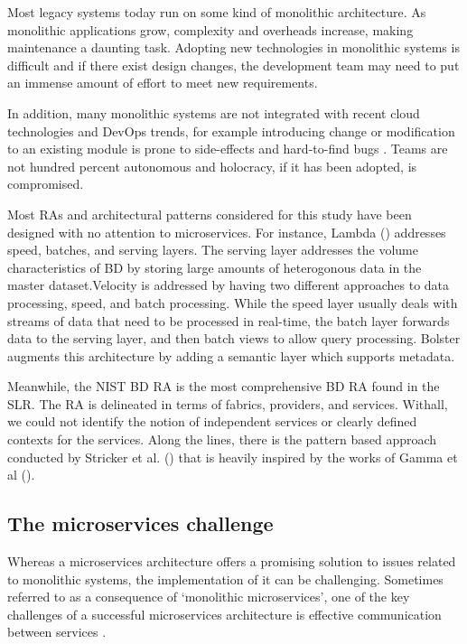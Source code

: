 \documentclass[runningheads]{llncs}
\begin{document}
Most legacy systems today run on some kind of monolithic architecture. As monolithic applications grow, complexity and overheads increase, making maintenance a daunting task. Adopting new technologies in monolithic systems is difficult and if there exist design changes, the development team may need to put an immense amount of effort to meet new requirements.

In addition, many monolithic systems are not integrated with recent cloud technologies and DevOps trends, for example introducing change or modification to an existing module is prone to side-effects and hard-to-find bugs \cite{Bass,Fritzsch}. Teams are not hundred percent autonomous and holocracy, if it has been adopted, is compromised.

Most RAs and architectural patterns considered for this study have been designed with no attention to microservices. For instance, Lambda (\cite{Villari}) addresses speed, batches, and serving layers. The serving layer addresses the volume characteristics of BD by storing large amounts of heterogonous data in the master dataset.Velocity is addressed by having two different approaches to data processing, speed, and batch processing. While the speed layer usually deals with streams of data that need to be processed in real-time, the batch layer forwards data to the serving layer, and then batch views to allow query processing. Bolster \cite{Nadal} augments this architecture by adding a semantic layer which supports metadata.

Meanwhile, the NIST BD RA \cite{Chang} is the most comprehensive BD RA found in the SLR. The RA is delineated in terms of fabrics, providers, and services. Withall, we could not identify the notion of independent services or clearly defined contexts for the services. Along the lines, there is the pattern based approach conducted by Stricker et al. (\cite{Stricker}) that is heavily inspired by the works of Gamma et al (\cite{Gamma}).

\subsection{The microservices challenge}

Whereas a microservices architecture offers a promising solution to issues related to monolithic systems, the implementation of it can be challenging.
Sometimes referred to as a consequence of ‘monolithic microservices’, one of the key challenges of a successful microservices architecture is effective communication between services \cite{Munaf}.
\end{document}
